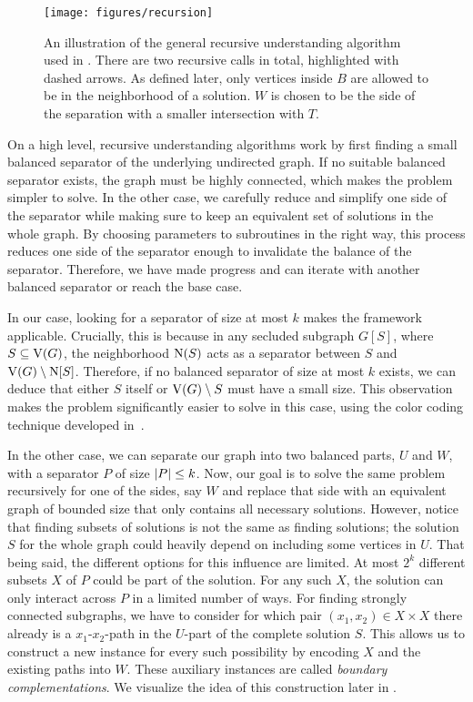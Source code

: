 \begin{figure}[t]
  \centering
  \texttt{[image: figures/recursion]}
  \caption{
  An illustration of the general recursive understanding algorithm used in .
  There are two recursive calls in total, highlighted with dashed arrows.
  As defined later, only vertices inside $B$ are allowed to be in the neighborhood of a solution.
  $W$ is chosen to be the side of the separation with a smaller intersection with $T$.
  }
  \label{fig:recursive_calls}
\end{figure}


On a high level, recursive understanding algorithms work by first finding a small balanced separator of the underlying undirected graph. If no suitable balanced separator exists, the graph must be highly connected, which makes the problem simpler to solve. In the other case, we carefully reduce and simplify one side of the separator while making sure to keep an equivalent set of solutions in the whole graph. By choosing parameters to subroutines in the right way, this process reduces one side of the separator enough to invalidate the balance of the separator. Therefore, we have made progress and can iterate with another balanced separator or reach the base case.

In our case, looking for a separator of size at most $k$ makes the framework applicable. Crucially, this is because in any secluded subgraph $G[S]$, where $S \subseteq \operatorname{V}({G})$, the neighborhood $\operatorname{N}({S})$ acts as a separator between $S$ and $\operatorname{V}({G}) \setminus \operatorname{N}[{S}]$. Therefore, if no balanced separator of size at most $k$ exists, we can deduce that either $S$ itself or $\operatorname{V}({G}) \setminus S$ must have a small size. This observation makes the problem significantly easier to solve in this case, using the color coding technique developed in~\cite{chitnis2016designing}.

In the other case, we can separate our graph into two balanced parts, $U$ and $W$, with a separator $P$ of size $\abs{P} \le k$. Now, our goal is to solve the same problem recursively for one of the sides, say $W$ and replace that side with an equivalent graph of bounded size that only contains all necessary solutions.
However, notice that finding subsets of solutions is not the same as finding solutions; the solution $S$ for the whole graph could heavily depend on including some vertices in $U$. That being said, the different options for this influence are limited. At most $2^k$ different subsets $X$ of $P$ could be part of the solution. For any such $X$, the solution can only interact across $P$ in a limited number of ways. For finding strongly connected subgraphs, we have to consider for which pair $(x_1, x_2) \in X \times X$ there already is a $x_1$-$x_2$-path in the $U$-part of the complete solution $S$. 
This allows us to construct a new instance for every such possibility by encoding $X$ and the existing paths into $W$. These auxiliary instances are called \emph{boundary complementations}. We visualize the idea of this construction later in .

